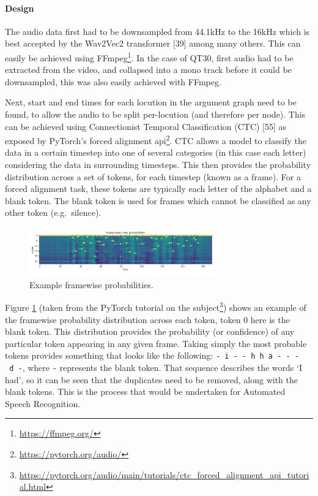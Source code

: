 \documentclass[twocolumn,twoside]{article}
\begin{document}
\paragraph{Design}\label{design}

The audio data first had to be downsampled from 44.1kHz to the 16kHz
which is best accepted by the Wav2Vec2 transformer {[}39{]} among many
others. This can easily be achieved using FFmpeg\footnote{\url{https://ffmpeg.org/}}.
In the case of QT30, first audio had to be extracted from the video, and
collapsed into a mono track before it could be downsampled, this was
also easily achieved with FFmpeg.

Next, start and end times for each locution in the argument graph need
to be found, to allow the audio to be split per-locution (and therefore
per node). This can be achieved using Connectionist Temporal
Classification (CTC) {[}55{]} as exposed by PyTorch's forced alignment
api\footnote{\url{https://pytorch.org/audio/}}. CTC allows a model to classify
the data in a certain timestep into one of several categories (in this
case each letter) considering the data in surrounding timesteps. This
then provides the probability distribution across a set of tokens, for
each timestep (known as a frame). For a forced alignment task, these
tokens are typically each letter of the alphabet and a blank token. The
blank token is used for frames which cannot be classified as any other
token (e.g.~silence).

\begin{figure}[h]
\centering
\includegraphics[width=8cm]{framewise-probs}
\caption{Example framewise probabilities. \label{fig:framewise-probs}}
\end{figure}

Figure \ref{fig:framewise-probs} (taken from the PyTorch tutorial on the
subject\footnote{\url{https://pytorch.org/audio/main/tutorials/ctc\_forced\_alignment\_api\_tutorial.html}})
shows an example of the framewise probability distribution across each
token, token 0 here is the blank token. This distribution provides the
probability (or confidence) of any particular token appearing in any
given frame. Taking simply the most probable tokens provides something
that looks like the following:
\texttt{-\ i\ -\ -\ h\ h\ a\ -\ -\ -\ d\ -}, where \texttt{-} represents
the blank token. That sequence describes the words `I had', so it can be
seen that the duplicates need to be removed, along with the blank
tokens. This is the process that would be undertaken for Automated
Speech Recognition.
\end{document}
